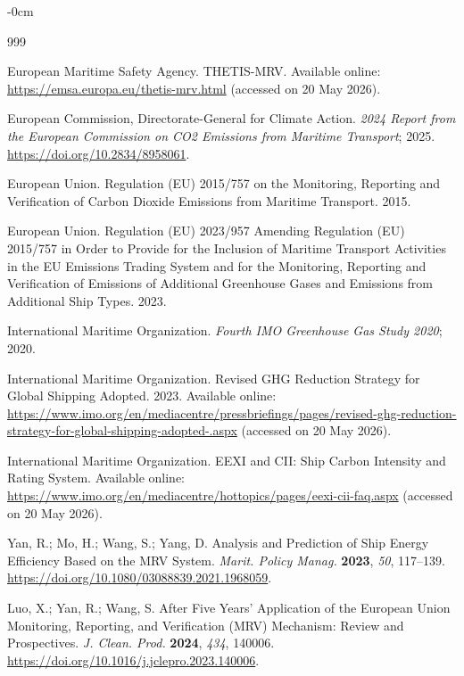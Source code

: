\documentclass[jmse,article,submit,pdftex,oneauthor]{Definitions/mdpi}
\begin{document}
\begin{adjustwidth}{-\extralength}{0cm}

\begin{thebibliography}{999}

European Maritime Safety Agency. THETIS-MRV. Available online: \url{https://emsa.europa.eu/thetis-mrv.html} (accessed on 20 May 2026).

European Commission, Directorate-General for Climate Action. \textit{2024 Report from the European Commission on CO2 Emissions from Maritime Transport}; 2025. \url{https://doi.org/10.2834/8958061}.

European Union. Regulation (EU) 2015/757 on the Monitoring, Reporting and Verification of Carbon Dioxide Emissions from Maritime Transport. 2015.

European Union. Regulation (EU) 2023/957 Amending Regulation (EU) 2015/757 in Order to Provide for the Inclusion of Maritime Transport Activities in the EU Emissions Trading System and for the Monitoring, Reporting and Verification of Emissions of Additional Greenhouse Gases and Emissions from Additional Ship Types. 2023.

International Maritime Organization. \textit{Fourth IMO Greenhouse Gas Study 2020}; 2020.

International Maritime Organization. Revised GHG Reduction Strategy for Global Shipping Adopted. 2023. Available online: \url{https://www.imo.org/en/mediacentre/pressbriefings/pages/revised-ghg-reduction-strategy-for-global-shipping-adopted-.aspx} (accessed on 20 May 2026).

International Maritime Organization. EEXI and CII: Ship Carbon Intensity and Rating System. Available online: \url{https://www.imo.org/en/mediacentre/hottopics/pages/eexi-cii-faq.aspx} (accessed on 20 May 2026).

Yan, R.; Mo, H.; Wang, S.; Yang, D. Analysis and Prediction of Ship Energy Efficiency Based on the MRV System. \textit{Marit. Policy Manag.} \textbf{2023}, \textit{50}, 117--139. \url{https://doi.org/10.1080/03088839.2021.1968059}.

Luo, X.; Yan, R.; Wang, S. After Five Years' Application of the European Union Monitoring, Reporting, and Verification (MRV) Mechanism: Review and Prospectives. \textit{J. Clean. Prod.} \textbf{2024}, \textit{434}, 140006. \url{https://doi.org/10.1016/j.jclepro.2023.140006}.


\end{thebibliography}
\end{adjustwidth}
\end{document}
